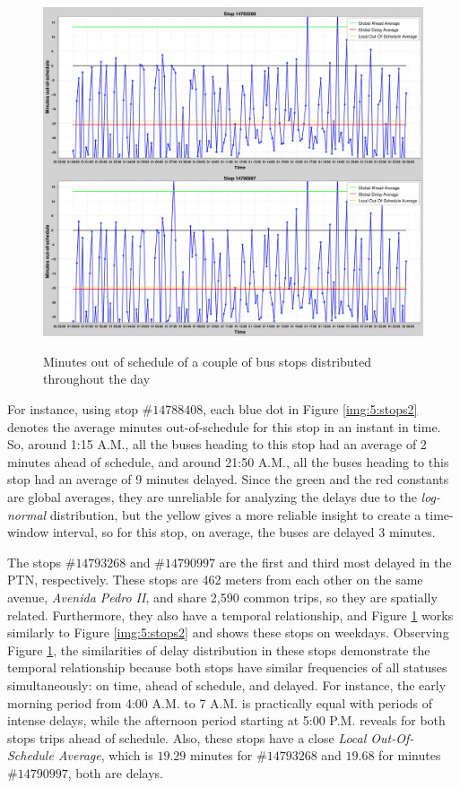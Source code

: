 \begin{figure}[b!]
     \centering
        \caption{Minutes out of schedule of a couple of bus stops distributed throughout the day}
        \includegraphics[width=\textwidth]{imagem/cap5/stops2.png}
        \label{img:5:stops}
\end{figure}

For instance, using stop $\#14788408$, each blue dot in Figure \ref{img:5:stops2} denotes the average
minutes out-of-schedule for this stop in an instant in time. So, around 1:15 A.M., all the buses heading to this stop had an average
of 2 minutes ahead of schedule, and around 21:50 A.M., all the buses heading to this stop had an average of 9 minutes delayed.
Since the green and the red constants are global averages, they are unreliable for analyzing the delays due to the {\em log-normal}
distribution, but the yellow gives a more reliable insight to create a time-window interval, so for 
this stop, on average, the buses are delayed 3 minutes.


The stops $\#14793268$ and $\#14790997$ are the first and third most delayed in the PTN, respectively.
These stops are 462 meters from each other on the same avenue, \textit{Avenida Pedro II}, and share 2,590 common trips, so they are spatially related. Furthermore, they also have a temporal relationship, and 
Figure \ref{img:5:stops} works similarly to Figure \ref{img:5:stops2} and shows these stops on weekdays. Observing Figure \ref{img:5:stops}, the similarities of
delay distribution in these stops demonstrate the temporal relationship because 
both stops have similar frequencies of all statuses simultaneously: on time, ahead of schedule, and delayed. For instance, the early morning period from 4:00 A.M. to 7 A.M. is
practically equal with periods of intense delays, while the afternoon period starting at 5:00 P.M. reveals for both stops trips ahead of schedule. Also, these stops have a close \textit{Local Out-Of-Schedule Average}, which is $19.29$ minutes for $\#14793268$ and $19.68$ for minutes $\#14790997$, both are delays.



